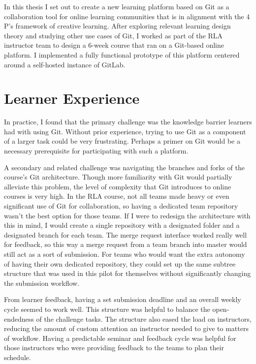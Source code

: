 \documentclass[12pt,twoside]{mitthesis}
\newcommand{\review}[1]{{\color{mygreen} #1}}
\begin{document}
\review{In this thesis I set out to create a new learning platform based on Git as a collaboration tool for online learning communities that is in alignment with the 4 P's framework of creative learning. After exploring relevant learning design theory and studying other use cases of Git, I worked as part of the RLA instructor team to design a 6-week course that ran on a Git-based online platform. I implemented a fully functional prototype of this platform centered around a self-hosted instance of GitLab.

\section{Learner Experience}

In practice, I found that the primary challenge was the knowledge barrier learners had with using Git. Without prior experience, trying to use Git as a component of a larger task could be very frustrating. Perhaps a primer on Git would be a necessary prerequisite for participating with such a platform. 

A secondary and related challenge was navigating the branches and forks of the course's Git architecture. Though more familiarity with Git would partially alleviate this problem, the level of complexity that Git introduces to online courses is very high. In the RLA course, not all teams made heavy or even significant use of Git for collaboration, so having a dedicated team repository wasn't the best option for those teams. If I were to redesign the architecture with this in mind, I would create a single repository with a designated folder and a designated branch for each team. The merge request interface worked really well for feedback, so this way a merge request from a team branch into master would still act as a sort of submission. For teams who would want the extra autonomy of having their own dedicated repository, they could set up the same subtree structure that was used in this pilot for themselves without significantly changing the submission workflow.

From learner feedback, having a set submission deadline and an overall weekly cycle seemed to work well. This structure was helpful to balance the open-endedness of the challenge tasks. The structure also eased the load on instructors, reducing the amount of custom attention an instructor needed to give to matters of workflow. Having a predictable seminar and feedback cycle was helpful for those instructors who were providing feedback to the teams to plan their schedule.

}
\end{document}
